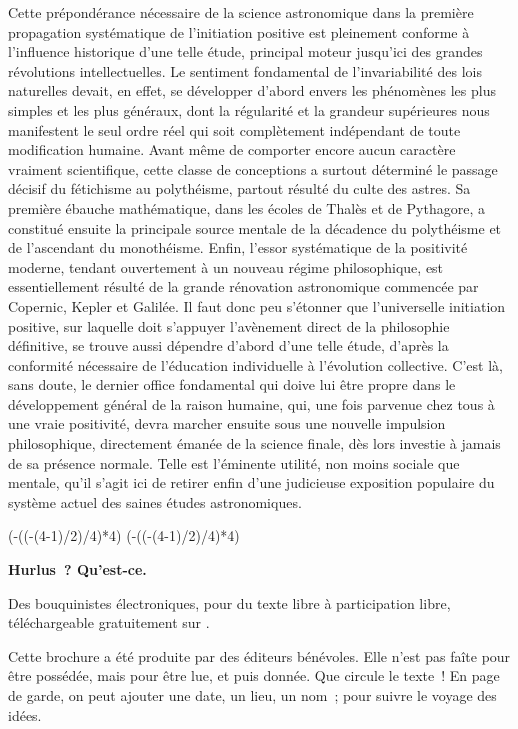 \documentclass[french,twoside]{book} %
\def\truncdiv#1#2{((#1-(#2-1)/2)/#2)}
\def\moduloop#1#2{(#1-\truncdiv{#1}{#2}*#2)}
\def\modulo#1#2{\number\numexpr\moduloop{#1}{#2}\relax}
\begin{document}
Cette prépondérance nécessaire de la science astronomique dans la première propagation systématique de l’initiation positive est pleinement conforme à l’influence historique d’une telle étude, principal moteur jusqu’ici des grandes révolutions intellectuelles. Le sentiment fondamental de l’invariabilité des lois naturelles devait, en effet, se développer d’abord envers les phénomènes les plus simples et les plus généraux, dont la régularité et la grandeur supérieures nous manifestent le seul ordre réel qui soit complètement indépendant de toute modification humaine. Avant même de comporter encore aucun caractère vraiment scientifique, cette classe de conceptions a surtout déterminé le passage décisif du fétichisme au polythéisme, partout résulté du culte des astres. Sa première ébauche mathématique, dans les écoles de Thalès et de Pythagore, a constitué ensuite la principale source mentale de la décadence du polythéisme et de l’ascendant du monothéisme. Enfin, l’essor systématique de la positivité moderne, tendant ouvertement à un nouveau régime philosophique, est essentiellement résulté de la grande rénovation astronomique commencée par Copernic, Kepler et Galilée. Il faut donc peu s’étonner que l’universelle initiation positive, sur laquelle doit s’appuyer l’avènement direct de la philosophie définitive, se trouve aussi dépendre d’abord d’une telle étude, d’après la conformité nécessaire de l’éducation individuelle à l’évolution collective. C’est là, sans doute, le dernier office fondamental qui doive lui être propre dans le développement général de la raison humaine, qui, une fois parvenue chez tous à une vraie positivité, devra marcher ensuite sous une nouvelle impulsion philosophique, directement émanée de la science finale, dès lors investie à jamais de sa présence normale. Telle est l’éminente utilité, non moins sociale que mentale, qu’il s’agit ici de retirer enfin d’une judicieuse exposition populaire du système actuel des saines études astronomiques.
 


\ifbooklet
  \pagestyle{empty}
  \clearpage
  \ifnum\modulo{\value{page}}{4}=0 \hbox{}\newpage\hbox{}\newpage\fi
  \ifnum\modulo{\value{page}}{4}=1 \hbox{}\newpage\hbox{}\newpage\fi


  \hbox{}\newpage
  \ifodd\value{page}\hbox{}\newpage\fi
  {\centering\color{rubric}\bfseries\noindent\large
    Hurlus ? Qu’est-ce.\par
    \bigskip
  }
  \noindent Des bouquinistes électroniques, pour du texte libre à participation libre,
  téléchargeable gratuitement sur \href{https://hurlus.fr}{}.\par
  \bigskip
  \noindent Cette brochure a été produite par des éditeurs bénévoles.
  Elle n’est pas faîte pour être possédée, mais pour être lue, et puis donnée.
  Que circule le texte !
  En page de garde, on peut ajouter une date, un lieu, un nom ; pour suivre le voyage des idées.
  \par
\end{document}
